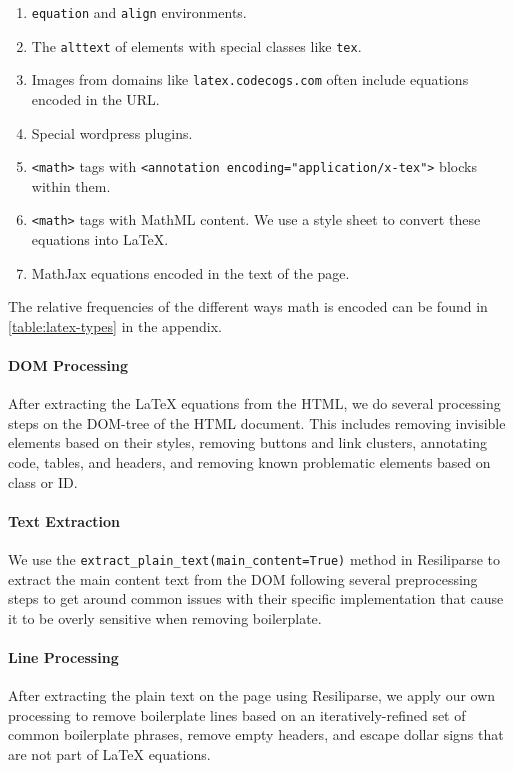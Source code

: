 \begin{enumerate}
    \item \texttt{equation} and \texttt{align} environments.
    \item The \texttt{alttext} of elements with special classes like \texttt{tex}.
    \item Images from domains like \texttt{latex.codecogs.com} often include equations encoded in the URL.
    \item Special wordpress plugins.
    \item \texttt{<math>} tags with \texttt{<annotation encoding="application/x-tex">} blocks within them.
    \item \texttt{<math>} tags with MathML content. We use a style sheet to convert these equations into \LaTeX{}.
    \item MathJax equations encoded in the text of the page.
\end{enumerate}

The relative frequencies of the different ways math is encoded can be found in \autoref{table:latex-types} in the appendix.

\paragraph{DOM Processing} After extracting the \LaTeX{} equations from the HTML, we do several processing steps on the DOM-tree of the HTML document. This includes removing invisible elements based on their styles, removing buttons and link clusters, annotating code, tables, and headers, and removing known problematic elements based on class or ID.

\paragraph{Text Extraction} We use the \texttt{extract\_plain\_text(main\_content=True)} method in Resiliparse \citep{bevendorff:2018} to extract the main content text from the DOM following several preprocessing steps to get around common issues with their specific implementation that cause it to be overly sensitive when removing boilerplate.

\paragraph{Line Processing} After extracting the plain text on the page using Resiliparse, we apply our own processing to remove boilerplate lines based on an iteratively-refined set of common boilerplate phrases, remove empty headers, and escape dollar signs that are not part of \LaTeX{} equations.

